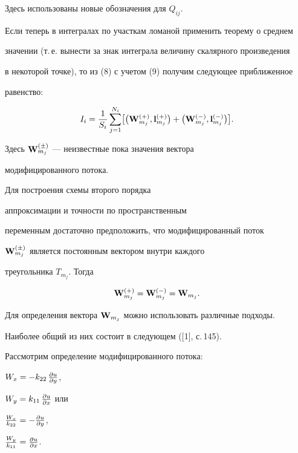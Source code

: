 Здесь использованы новые обозначения для $Q_{ij}$.


Если теперь в интегралах по участкам ломаной применить теорему о среднем


значении (т.\,е. вынести за знак интеграла величину скалярного произведения


в некоторой точке), то из (8) с учетом (9) получим следующее приближенное


равенство:


\begin{equation}


\lEq{11}


I_i = \frac{1}{S_i}\sum_{j=1}^{N_i}\bigl[


\bigl({\bold W}_{m_j}^{(+)},{\bold l}_{m_j}^{(+)}\bigr) + 


\bigl({\bold W}_{m_j}^{(-)},{\bold l}_{m_j}^{(-)}\bigr) 


\bigr].


\end{equation}


Здесь ${\bold W}_{m_j}^{(\pm)}$ --- неизвестные пока значения вектора


модифицированного потока.








Для построения схемы второго порядка 


аппроксимации и точности по пространственным


переменным достаточно предположить, что модифицированный поток 


${\bold W}_{m_j}^{(\pm)}$ является постоянным вектором внутри каждого


треугольника $T_{m_j}$. Тогда


$$


{\bold W}_{m_j}^{(+)}={\bold W}_{m_j}^{(-)}={\bold W}_{m_j}.


$$


Для определения вектора ${\bold W}_{m_j}$ можно использовать различные подходы.


Наиболее общий из них состоит в следующем ([1], с.\,145).


Рассмотрим определение модифицированного потока:


$W_x = -k_{22}\,\frac{\partial u}{\partial y}$,


$W_y = k_{11}\,\frac{\partial u}{\partial x}$ или


$\frac{W_x}{k_{22}} = - \frac{\partial u}{\partial y}$,


$\frac{W_y}{k_{11}} = \frac{\partial u}{\partial x}$.


